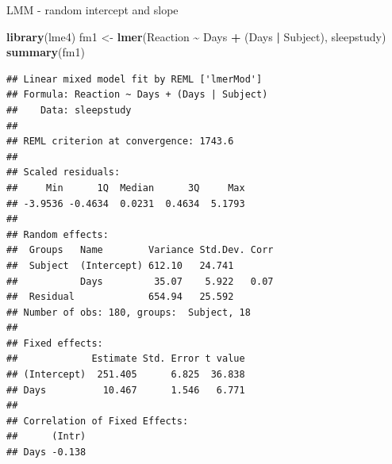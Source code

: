\documentclass[
  ignorenonframetext,
]{beamer}
\newenvironment{Shaded}{\begin{snugshade}}{\end{snugshade}}
\newcommand{\FunctionTok}[1]{\textcolor[rgb]{0.13,0.29,0.53}{\textbf{#1}}}
\newcommand{\NormalTok}[1]{#1}
\newcommand{\OtherTok}[1]{\textcolor[rgb]{0.56,0.35,0.01}{#1}}
\newcommand{\SpecialCharTok}[1]{\textcolor[rgb]{0.81,0.36,0.00}{\textbf{#1}}}
\begin{document}
\begin{frame}[fragile]
\begin{block}{LMM - random intercept and slope}
\protect\hypertarget{lmm---random-intercept-and-slope}{}
\begin{Shaded}
\begin{Highlighting}[]
\FunctionTok{library}\NormalTok{(lme4)}
\NormalTok{fm1 }\OtherTok{\textless{}{-}} \FunctionTok{lmer}\NormalTok{(Reaction }\SpecialCharTok{\textasciitilde{}}\NormalTok{ Days }\SpecialCharTok{+}\NormalTok{ (Days }\SpecialCharTok{|}\NormalTok{ Subject), sleepstudy)}
\FunctionTok{summary}\NormalTok{(fm1)}
\end{Highlighting}
\end{Shaded}

\begin{verbatim}
## Linear mixed model fit by REML ['lmerMod']
## Formula: Reaction ~ Days + (Days | Subject)
##    Data: sleepstudy
## 
## REML criterion at convergence: 1743.6
## 
## Scaled residuals: 
##     Min      1Q  Median      3Q     Max 
## -3.9536 -0.4634  0.0231  0.4634  5.1793 
## 
## Random effects:
##  Groups   Name        Variance Std.Dev. Corr
##  Subject  (Intercept) 612.10   24.741       
##           Days         35.07    5.922   0.07
##  Residual             654.94   25.592       
## Number of obs: 180, groups:  Subject, 18
## 
## Fixed effects:
##             Estimate Std. Error t value
## (Intercept)  251.405      6.825  36.838
## Days          10.467      1.546   6.771
## 
## Correlation of Fixed Effects:
##      (Intr)
## Days -0.138
\end{verbatim}
\end{block}
\end{frame}
\end{document}
